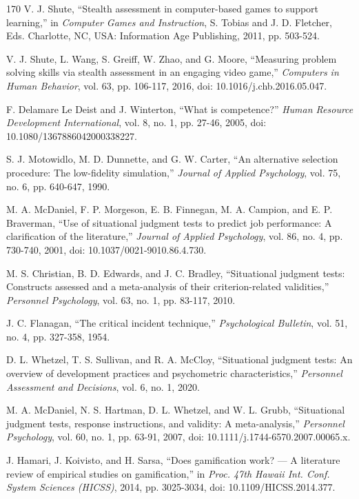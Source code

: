 \begin{thebibliography}{170}
 V. J. Shute, ``Stealth assessment in computer-based games to support learning,'' in \textit{Computer Games and Instruction}, S. Tobias and J. D. Fletcher, Eds. Charlotte, NC, USA: Information Age Publishing, 2011, pp. 503-524.

 V. J. Shute, L. Wang, S. Greiff, W. Zhao, and G. Moore, ``Measuring problem solving skills via stealth assessment in an engaging video game,'' \textit{Computers in Human Behavior}, vol. 63, pp. 106-117, 2016, doi: 10.1016/j.chb.2016.05.047.

 F. Delamare Le Deist and J. Winterton, ``What is competence?'' \textit{Human Resource Development International}, vol. 8, no. 1, pp. 27-46, 2005, doi: 10.1080/1367886042000338227.

 S. J. Motowidlo, M. D. Dunnette, and G. W. Carter, ``An alternative selection procedure: The low-fidelity simulation,'' \textit{Journal of Applied Psychology}, vol. 75, no. 6, pp. 640-647, 1990.

 M. A. McDaniel, F. P. Morgeson, E. B. Finnegan, M. A. Campion, and E. P. Braverman, ``Use of situational judgment tests to predict job performance: A clarification of the literature,'' \textit{Journal of Applied Psychology}, vol. 86, no. 4, pp. 730-740, 2001, doi: 10.1037/0021-9010.86.4.730.

 M. S. Christian, B. D. Edwards, and J. C. Bradley, ``Situational judgment tests: Constructs assessed and a meta-analysis of their criterion-related validities,'' \textit{Personnel Psychology}, vol. 63, no. 1, pp. 83-117, 2010.

 J. C. Flanagan, ``The critical incident technique,'' \textit{Psychological Bulletin}, vol. 51, no. 4, pp. 327-358, 1954.

 D. L. Whetzel, T. S. Sullivan, and R. A. McCloy, ``Situational judgment tests: An overview of development practices and psychometric characteristics,'' \textit{Personnel Assessment and Decisions}, vol. 6, no. 1, 2020.

 M. A. McDaniel, N. S. Hartman, D. L. Whetzel, and W. L. Grubb, ``Situational judgment tests, response instructions, and validity: A meta-analysis,'' \textit{Personnel Psychology}, vol. 60, no. 1, pp. 63-91, 2007, doi: 10.1111/j.1744-6570.2007.00065.x.

 J. Hamari, J. Koivisto, and H. Sarsa, ``Does gamification work? --- A literature review of empirical studies on gamification,'' in \textit{Proc. 47th Hawaii Int. Conf. System Sciences (HICSS)}, 2014, pp. 3025-3034, doi: 10.1109/HICSS.2014.377.


\end{thebibliography}
